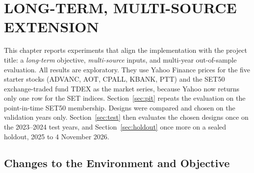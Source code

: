 
\chapter{LONG-TERM, MULTI-SOURCE EXTENSION}
\label{chap:extension}

This chapter reports experiments that align the implementation with the project title: a
\emph{long-term} objective, \emph{multi-source} inputs, and multi-year out-of-sample evaluation.
All results are exploratory. They use Yahoo Finance prices for the five starter stocks (ADVANC, AOT,
CPALL, KBANK, PTT) and the SET50 exchange-traded fund TDEX as the market series, because Yahoo now
returns only one row for the SET indices. Section~\ref{sec:pit} repeats the evaluation on the
point-in-time SET50 membership. Designs were compared and chosen on the validation years only.
Section~\ref{sec:test} then evaluates the chosen designs once on the 2023--2024 test years, and
Section~\ref{sec:holdout} once more on a sealed holdout, 2025 to 4 November 2026.

\section{Changes to the Environment and Objective}

